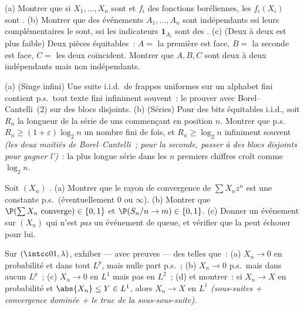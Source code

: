 \begin{exercise}[$\star\star$]\label{exo:b3:probability:3}
(a) Montrer que si $X_1, \dots, X_n$ sont  et
$f_i$ des fonctions boréliennes, les $f_i(X_i)$ sont
.
(b) Montrer que des événements $A_1, \dots, A_n$ sont
indépendants ssi leurs complémentaires le sont, ssi les
indicateurs $\mathbf 1_{A_i}$ sont des 
.
(c) (Deux à deux est plus faible) Deux pièces équitables~:
$A =$ la première est face, $B =$ la seconde est face, $C
=$ les deux coïncident. Montrer que $A, B, C$ sont deux à
deux indépendants mais non indépendants.
\end{exercise}

\begin{exercise}[$\star\star$]\label{exo:b3:probability:4}
(a) (Singe infini) Une suite i.i.d.\ de frappes uniformes
sur un alphabet fini contient p.s.\ tout texte fini
infiniment souvent~: le prouver avec Borel--Cantelli~(2) sur
des blocs disjoints.
(b) (Séries) Pour des bits équitables i.i.d., soit $R_n$ la
longueur de la série de uns commençant en position $n$.
Montrer que p.s.\ $R_n \geq (1+\varepsilon)\log_2n$ un
nombre fini de fois, et $R_n \geq \log_2 n$ infiniment
souvent \emph{(les deux moitiés de Borel--Cantelli~; pour la
seconde, passer à des blocs disjoints pour gagner
l')}~: la plus longue série dans les $n$
premiers chiffres croît comme $\log_2n$.
\end{exercise}

\begin{exercise}[$\star\star$]\label{exo:b3:probability:5}
Soit $(X_n)$ .
(a) Montrer que le rayon de convergence de $\sum X_n z^n$
est une constante p.s.\ (éventuellement $0$ ou $\infty$).
(b) Montrer que $\P(\sum X_n \text{ converge}) \in \{0,
1\}$ et $\P(S_n/n \to m) \in \{0,1\}$.
(c) Donner un événement sur $(X_n)$ qui n'est \emph{pas} un
événement de queue, et vérifier que la  peut
échouer pour lui.
\end{exercise}

\begin{exercise}[$\star\star$]\label{exo:b3:probability:6}
Sur $(\intcc01, \lambda)$, exhiber --- avec preuves --- des
 telles que~:
(a) $X_n \to 0$ en probabilité et dans tout $L^p$, mais
nulle part p.s.~;
(b) $X_n \to 0$ p.s.\ mais dans aucun $L^p$~;
(c) $X_n \to 0$ en $L^1$ mais pas en $L^2$~;
(d) et montrer~: si $X_n \to X$ en probabilité et $\abs{X_n}
\leq Y \in L^1$, alors $X_n \to X$ en $L^1$
\emph{(sous-suites + convergence dominée + le truc de la
sous-sous-suite)}.
\end{exercise}

